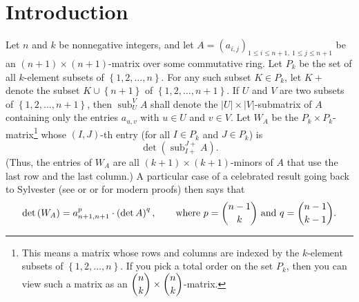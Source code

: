 \documentclass[numbers=enddot,12pt,final,onecolumn,notitlepage]{scrartcl}%
\theoremstyle{definition}
\begin{document}
\section{Introduction}

Let $n$ and $k$ be nonnegative integers, and let $A=\left(  a_{i,j}\right)
_{1\leq i\leq n+1,\ 1\leq j\leq n+1}$ be an $\left(  n+1\right)  \times\left(
n+1\right)  $-matrix over some commutative ring. Let $P_{k}$ be the set of all
$k$-element subsets of $\left\{  1,2,\ldots,n\right\}  $. For any such subset
$K\in P_{k}$, let $K+$ denote the subset $K\cup\left\{  n+1\right\}  $ of
$\left\{  1,2,\ldots,n+1\right\}  $. If $U$ and $V$ are two subsets of
$\left\{  1,2,\ldots,n+1\right\}  $, then $\operatorname*{sub}\nolimits_{U}%
^{V}A$ shall denote the $\left\vert U\right\vert \times\left\vert V\right\vert
$-submatrix of $A$ containing only the entries $a_{u,v}$ with $u\in U$ and
$v\in V$. Let $W_{A}$ be the $P_{k}\times P_{k}$-matrix\footnote{This means a
matrix whose rows and columns are indexed by the $k$-element subsets of
$\left\{  1,2,\ldots,n\right\}  $. If you pick a total order on the set
$P_{k}$, then you can view such a matrix as an $\dbinom{n}{k}\times\dbinom
{n}{k}$-matrix.} whose $\left(  I,J\right)  $-th entry (for all $I\in P_{k}$
and $J\in P_{k}$) is
\[
\det\left(  \operatorname*{sub}\nolimits_{I+}^{J+}A\right)  .
\]
(Thus, the entries of $W_{A}$ are all $\left(  k+1\right)  \times\left(
k+1\right)  $-minors of $A$ that use the last row and the last column.) A
particular case of a celebrated result going back to Sylvester \cite{Sylves51}
(see \cite[\S 2.7]{Prasolov} or \cite[Teorema 2.9.1]{Prasol15} or
\cite{Mohr53} for modern proofs) then says that%
\[
\det\left(  W_{A}\right)  =a_{n+1,n+1}^{p}\cdot\left(  \det A\right)
^{q},\qquad\text{where }p=\dbinom{n-1}{k}\text{ and }q=\dbinom{n-1}{k-1}.
\]
\end{document}

